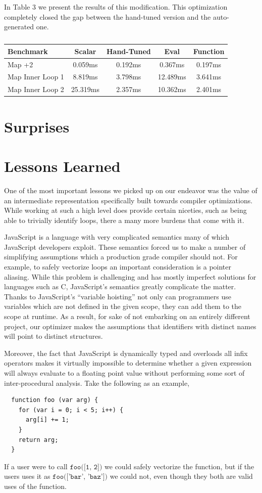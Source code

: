 \documentclass[conference]{IEEEtran}
\begin{document}
In Table 3 we present the results of this modification. This optimization
completely closed the gap between the hand-tuned version and the auto-generated
one.

\begin{table}[!t]
\centering
\caption{}
\begin{tabular}{|l||c|c|c|c|}
\hline
Benchmark & Scalar & Hand-Tuned & Eval & Function \\ \hline
Map +2 & 0.059ms & 0.192ms & 0.367ms & 0.197ms \\ \hline
Map Inner Loop 1 & 8.819ms & 3.798ms & 12.489ms & 3.641ms \\ \hline
Map Inner Loop 2 & 25.319ms & 2.357ms & 10.362ms & 2.401ms \\ \hline
\end{tabular}
\end{table}

\section{Surprises}
\section{Lessons Learned}

One of the most important lessons we picked up on our endeavor was the value
of an intermediate representation specifically built towards compiler
optimizations. While working at such a high level does provide certain
niceties, such as being able to trivially identify loops, there a many more
burdens that come with it.

JavaScript is a language with very complicated semantics many of which
JavaScript developers exploit. These semantics forced us to make a number of
simplifying assumptions which a production grade compiler should not. For
example, to safely vectorize loops an important consideration is a pointer
aliasing. While this problem is challenging and has mostly imperfect
solutions for languages such as C, JavaScript's semantics greatly complicate
the matter.  Thanks to JavaScript's ``variable hoisting'' not only can
programmers use variables which are not defined in the given scope, they can
add them to the scope at runtime. As a result, for sake of not embarking on
an entirely different project, our optimizer makes the assumptions that
identifiers with distinct names will point to distinct structures.

Moreover, the fact that JavaScript is dynamically typed and overloads all
infix operators makes it virtually impossible to determine whether a given
expression will always evaluate to a floating point value without performing
some sort of inter-procedural analysis. Take the following as an example,
\begin{verbatim}
  function foo (var arg) {
    for (var i = 0; i < 5; i++) {
      arg[i] += 1;
    }
    return arg;
  }
\end{verbatim}
If a user were to call $\texttt{foo([1, 2])}$ we could safely vectorize the
function, but if the users uses it as $\texttt{foo(['bar', 'baz'])}$ we could
not, even though they both are valid uses of the function.
\end{document}
